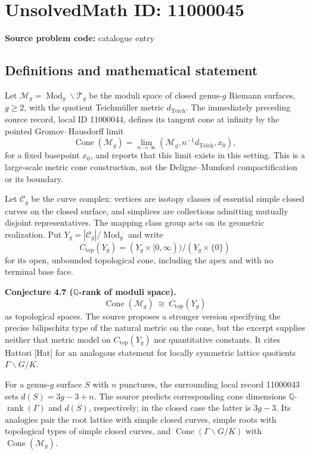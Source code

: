 \documentclass[11pt]{article}
\newcommand{\Q}{\mathbb{Q}}
\begin{document}
\section*{UnsolvedMath ID: 11000045}
\textbf{Source problem code:} catalogue entry
\subsection{Definitions and mathematical statement}
Let $\mathcal M_g=\operatorname{Mod}_g\backslash\mathcal T_g$ be the moduli space of closed genus-$g$ Riemann surfaces, $g\ge2$, with the quotient Teichm\"uller metric $d_{\mathrm{Teich}}$. The immediately preceding source record, local ID 11000044, defines its tangent cone at infinity by the pointed Gromov--Hausdorff limit
\[
 \operatorname{Cone}(\mathcal M_g)=
 \lim_{n\to\infty}(\mathcal M_g,n^{-1}d_{\mathrm{Teich}},x_0),
\]
for a fixed basepoint $x_0$, and reports that this limit exists in this setting. This is a large-scale metric cone construction, not the Deligne--Mumford compactification or its boundary.

Let $\mathcal C_g$ be the curve complex: vertices are isotopy classes of essential simple closed curves on the closed surface, and simplices are collections admitting mutually disjoint representatives. The mapping class group acts on its geometric realization. Put $Y_g=|\mathcal C_g|/\operatorname{Mod}_g$ and write
\[
 C_{\mathrm{top}}(Y_g)=(Y_g\times[0,\infty))/(Y_g\times\{0\})
\]
for its open, unbounded topological cone, including the apex and with no terminal base face.

\textbf{Conjecture 4.7 ($\Q$-rank of moduli space).}
\[
 \operatorname{Cone}(\mathcal M_g)\ \cong\ C_{\mathrm{top}}(Y_g)
\]
as topological spaces. The source proposes a stronger version specifying the precise bilipschitz type of the natural metric on the cone, but the excerpt supplies neither that metric model on $C_{\mathrm{top}}(Y_g)$ nor quantitative constants. It cites Hattori [Hat] for an analogous statement for locally symmetric lattice quotients $\Gamma\backslash G/K$.

For a genus-$g$ surface $S$ with $n$ punctures, the surrounding local record 11000043 sets $d(S)=3g-3+n$. The source predicts corresponding cone dimensions $\Q$-$\operatorname{rank}(\Gamma)$ and $d(S)$, respectively; in the closed case the latter is $3g-3$. Its analogies pair the root lattice with simple closed curves, simple roots with topological types of simple closed curves, and $\operatorname{Cone}(\Gamma\backslash G/K)$ with $\operatorname{Cone}(\mathcal M_g)$.
\end{document}
